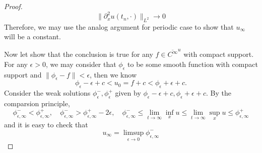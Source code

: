 \begin{proof}
    \[\lVert \partial^2_x u(t_n,\cdot)\rVert_{L^2} \to 0\]
    Therefore, we may use the analog argument for periodic case to show that $u_{\infty}$ will be a constant.\par
    Now let show that the conclusion is true for any $f\in \overline{C^{\infty}}^u$ with compact support. For any $\epsilon > 0$, we may consider that $\phi_{\epsilon}$ to be some smooth function with compact support and $\lVert \phi_{\epsilon} - f\rVert <\epsilon$, then we know
    \[
    \phi_{\epsilon} - \epsilon +c < u_0 = f +c < \phi_{\epsilon} + \epsilon +c.
    \]
    Consider the weak solutions $\phi^-_{\epsilon},\phi^+_{\epsilon}$ given by $\phi_{\epsilon} - \epsilon +c, \phi_{\epsilon} + \epsilon +c$. By the comparsion principle,
    \[\phi^-_{\epsilon,\infty} < \phi^+_{\epsilon,\infty},\quad \phi^-_{\epsilon,\infty} > \phi^+_{\epsilon,\infty} - 2\epsilon,\quad\phi^-_{\epsilon,\infty} \leq \lim_{t\to \infty}\inf_x u \leq\lim_{t\to \infty}\sup_x u \leq \phi^+_{\epsilon,\infty} \]
    and it is easy to check that
    \[
    u_{\infty} = \limsup_{\epsilon \to 0} \phi^{-}_{\epsilon,\infty}
    \]
\end{proof}


